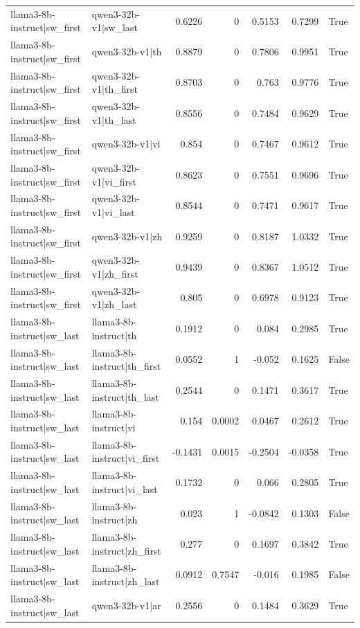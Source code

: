 \begin{table}
\begin{tabular}{l l r r r r l}
llama3-8b-instruct|sw_first & qwen3-32b-v1|sw_last & 0.6226 & 0 & 0.5153 & 0.7299 & True \\
llama3-8b-instruct|sw_first & qwen3-32b-v1|th & 0.8879 & 0 & 0.7806 & 0.9951 & True \\
llama3-8b-instruct|sw_first & qwen3-32b-v1|th_first & 0.8703 & 0 & 0.763 & 0.9776 & True \\
llama3-8b-instruct|sw_first & qwen3-32b-v1|th_last & 0.8556 & 0 & 0.7484 & 0.9629 & True \\
llama3-8b-instruct|sw_first & qwen3-32b-v1|vi & 0.854 & 0 & 0.7467 & 0.9612 & True \\
llama3-8b-instruct|sw_first & qwen3-32b-v1|vi_first & 0.8623 & 0 & 0.7551 & 0.9696 & True \\
llama3-8b-instruct|sw_first & qwen3-32b-v1|vi_last & 0.8544 & 0 & 0.7471 & 0.9617 & True \\
llama3-8b-instruct|sw_first & qwen3-32b-v1|zh & 0.9259 & 0 & 0.8187 & 1.0332 & True \\
llama3-8b-instruct|sw_first & qwen3-32b-v1|zh_first & 0.9439 & 0 & 0.8367 & 1.0512 & True \\
llama3-8b-instruct|sw_first & qwen3-32b-v1|zh_last & 0.805 & 0 & 0.6978 & 0.9123 & True \\
llama3-8b-instruct|sw_last & llama3-8b-instruct|th & 0.1912 & 0 & 0.084 & 0.2985 & True \\
llama3-8b-instruct|sw_last & llama3-8b-instruct|th_first & 0.0552 & 1 & -0.052 & 0.1625 & False \\
llama3-8b-instruct|sw_last & llama3-8b-instruct|th_last & 0.2544 & 0 & 0.1471 & 0.3617 & True \\
llama3-8b-instruct|sw_last & llama3-8b-instruct|vi & 0.154 & 0.0002 & 0.0467 & 0.2612 & True \\
llama3-8b-instruct|sw_last & llama3-8b-instruct|vi_first & -0.1431 & 0.0015 & -0.2504 & -0.0358 & True \\
llama3-8b-instruct|sw_last & llama3-8b-instruct|vi_last & 0.1732 & 0 & 0.066 & 0.2805 & True \\
llama3-8b-instruct|sw_last & llama3-8b-instruct|zh & 0.023 & 1 & -0.0842 & 0.1303 & False \\
llama3-8b-instruct|sw_last & llama3-8b-instruct|zh_first & 0.277 & 0 & 0.1697 & 0.3842 & True \\
llama3-8b-instruct|sw_last & llama3-8b-instruct|zh_last & 0.0912 & 0.7547 & -0.016 & 0.1985 & False \\
llama3-8b-instruct|sw_last & qwen3-32b-v1|ar & 0.2556 & 0 & 0.1484 & 0.3629 & True \\

\end{tabular}
\end{table}
